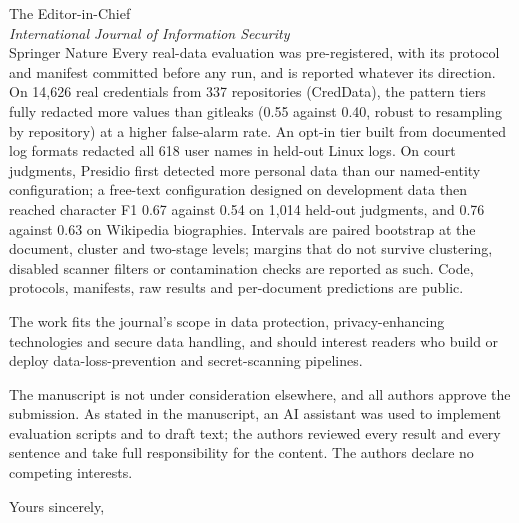 \documentclass[10pt]{letter}
\begin{document}
\begin{letter}{The Editor-in-Chief\\ \emph{International Journal of Information Security}\\ Springer Nature}
Every real-data evaluation was pre-registered, with its protocol and manifest committed before any run, and is reported whatever its direction. On 14,626 real credentials from 337 repositories (CredData), the pattern tiers fully redacted more values than gitleaks (0.55 against 0.40, robust to resampling by repository) at a higher false-alarm rate. An opt-in tier built from documented log formats redacted all 618 user names in held-out Linux logs. On court judgments, Presidio first detected more personal data than our named-entity configuration; a free-text configuration designed on development data then reached character F1 0.67 against 0.54 on 1,014 held-out judgments, and 0.76 against 0.63 on Wikipedia biographies. Intervals are paired bootstrap at the document, cluster and two-stage levels; margins that do not survive clustering, disabled scanner filters or contamination checks are reported as such. Code, protocols, manifests, raw results and per-document predictions are public.

The work fits the journal's scope in data protection, privacy-enhancing technologies and secure data handling, and should interest readers who build or deploy data-loss-prevention and secret-scanning pipelines.

The manuscript is not under consideration elsewhere, and all authors approve the submission. As stated in the manuscript, an AI assistant was used to implement evaluation scripts and to draft text; the authors reviewed every result and every sentence and take full responsibility for the content. The authors declare no competing interests.

\closing{Yours sincerely,}

\end{letter}
\end{document}
